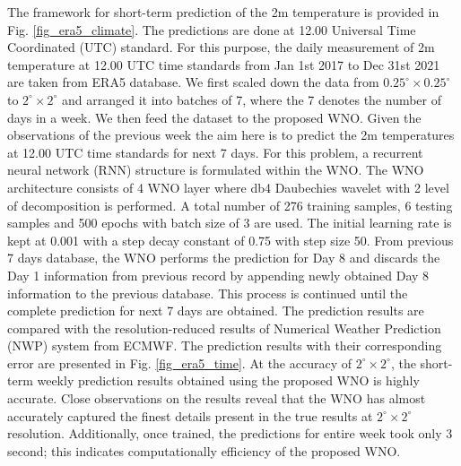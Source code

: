 \documentclass{article}
\begin{document}
The framework for short-term prediction of the 2m temperature is provided in Fig. \ref{fig_era5_climate}. The predictions are done at 12.00 Universal Time Coordinated (UTC) standard. For this purpose, the daily measurement of 2m temperature at 12.00 UTC time standards  from Jan 1st 2017 to Dec 31st 2021 are taken from ERA5 database. We first scaled down the data from $0.25^{\circ} \times 0.25^{\circ}$ to $2^{\circ} \times 2^{\circ}$ and arranged it into batches of 7, where the 7 denotes the number of days in a week. We then feed the dataset to the proposed WNO. Given the observations of the previous week the aim here is to predict the 2m temperatures at 12.00 UTC time standards for next 7 days. 
For this problem, a recurrent neural network (RNN) structure is formulated within the WNO. The WNO architecture consists of 4 WNO layer where db4 Daubechies wavelet with 2 level of decomposition is performed. A total number of 276 training samples, 6 testing samples and 500 epochs with batch size of 3 are used. The initial learning rate is kept at 0.001 with a step decay constant of 0.75 with step size 50. From previous 7 days database, the WNO performs the prediction for Day 8 and discards the Day 1 information from previous record by appending newly obtained Day 8 information to the previous database. This process is continued until the complete prediction for next 7 days are obtained. The prediction results are compared with the resolution-reduced results of Numerical Weather Prediction (NWP) system from ECMWF. The prediction results with their corresponding error are presented in Fig. \ref{fig_era5_time}. At the accuracy of $2^{\circ} \times 2^{\circ}$, the short-term weekly prediction results obtained using the proposed WNO is highly accurate. Close observations on the results reveal that the WNO has almost accurately captured the finest details present in the true results at $2^{\circ} \times 2^{\circ}$ resolution. Additionally, once trained, the predictions for entire week took only 3 second; this indicates computationally efficiency of the proposed WNO.
\end{document}
